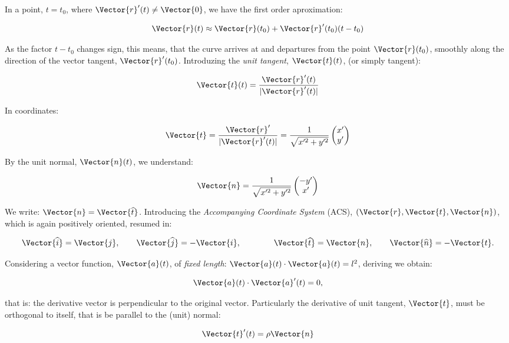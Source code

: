  In a point, $t=t_0$, where $\Vector{r}'(t) \neq \Vector{0}$, we have the first order aproximation:
 
 \begin{equation}
  \label{eq:taylor:1}
  \Vector{r}(t)
  \approx
  \Vector{r}(t_0)
  +
  \Vector{r}'(t_0)(t-t_0)
\end{equation}

 As the factor $t-t_0$ changes sign, this means, that the 
 curve arrives at and departures from the point $\Vector{r}(t_0)$,
 smoothly along the direction of the vector tangent, $\Vector{r}'(t_0)$. 
 Introduzing the \emph{unit tangent}, $\Vector{t}(t)$, (or simply tangent):
 
 \[
  \Vector{t}(t)=\frac{\Vector{r}'(t)}{|\Vector{r}'(t)|}
 \]
 
In coordinates:

\[
 \Vector{t}=
 \frac{\Vector{r}'}{|\Vector{r}'(t)|}
 =
 \frac{1}{\sqrt{x'^2+y'^2}}
 \begin{pmatrix}
  x'\\y'
 \end{pmatrix}
\]

By the unit normal, $\Vector{n}(t)$, we understand:

\[
 \Vector{n}=
 \frac{1}{\sqrt{x'^2+y'^2}}
 \begin{pmatrix}
  -y'\\x'
 \end{pmatrix} 
\]

We write: $\Vector{n}=\Vector{\widehat{t}}$. 
Introducing the \emph{Accompanying Coordinate System} (ACS), $(\Vector{r},\Vector{t},\Vector{n})$,
which is again positively oriented, resumed in:

\[
 \Vector{\widehat{i}}=\Vector{j},
 \qquad
 \Vector{\widehat{j}}=-\Vector{i},
 \qquad \qquad
 \Vector{\widehat{t}}=\Vector{n},
 \qquad
 \Vector{\widehat{n}}=-\Vector{t}.
 \]

 
 
Considering a vector function, $\Vector{a}(t)$, of \emph{fixed length}: 
$\Vector{a}(t) \cdot \Vector{a}(t)=l^2$, 
deriving we obtain:

\[
 \Vector{a}(t) \cdot \Vector{a}'(t)=0,
\]

that is: the derivative vector is perpendicular to the original vector. Particularly the derivative
of unit tangent, $\Vector{t}$,
must be orthogonal to itself, that is be parallel to the (unit) normal:

\begin{equation}
  \label{eq:curvature}
 \Vector{t}'(t)
 =
 \rho \Vector{n}
\end{equation}

